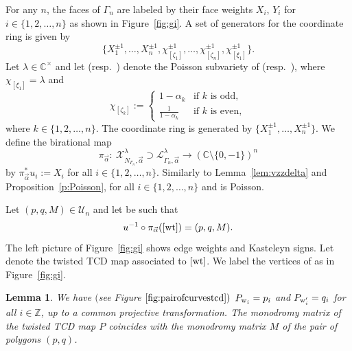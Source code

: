 \documentclass[pdftex]{sigma}
\numberwithin{equation}{section}
\newtheorem{Lemma}[Theorem]{Lemma}
\newcommand{\Z}{{\mathbb Z}}
\newcommand{\C}{{\mathbb C}}
\newcommand{\CP}{{\mathbb C\mathrm P}}
\newcommand{\A}{{\mathbb A}}
\newcommand{\ra}{\rightarrow}
\newcommand{\la}{\label}
\newcommand{\w}{{\rm w}}
\newcommand{\wt}{{\rm wt}}
\begin{document}
	For any $n$, the faces of $\Gamma_n$ are labeled by their face weights $X_i$, $Y_i$ for $i \in \{1,2,\dots,n\}$ as shown in Figure~\ref{fig:gi}. A set of generators for the coordinate ring  is given by	
	\[
	\bigl\{X_1^{\pm 1}, \dots,X_n^{\pm 1},\chi_{[\zeta_1]}^{\pm 1},\dots,\chi_{[\zeta_n]}^{\pm 1},\chi_{[\xi_1]}^{\pm 1}\bigr\}.
	\]
Let $\lambda \in \C^\times$ and let  \big(resp.\ \big) denote the Poisson subvariety of  \big(resp.\ \big), where $\chi_{[\xi_1]}=\lambda$ and
	\[
	\chi_{[\zeta_{k}]} := \begin{cases}
		1-\alpha_{k}&\text{if $k$ is odd},\\
		\frac{1}{1-\alpha_{k}}&\text{if $k$ is even},
	\end{cases} \]
	where $k \in \{1,2,\dots,n\}$. The coordinate ring  is generated by $\bigl\{X_1^{\pm 1}, \dots,X_n^{\pm 1}\bigr\}$. We define the birational map
\[
\pi_{\vec \alpha} \colon \ \mathcal X_{N_{\Gamma_n},\vec \alpha}^\lambda \supset \mathcal L_{\Gamma_n,\vec \alpha}^\lambda \ra (\C \setminus \{0,-1\})^n
\]
 by $\pi_{\vec \alpha}^*u_i := X_i$ for all $i \in \{1,2,\dots,n\}$. Similarly to Lemma~\ref{lem:vzzdelta} and Proposition~\ref{p:Poisson},  for all $i \in \{1,2,\dots,n\}$ and \smash{$\pi_{\vec \alpha}$} is Poisson.
	
	
	Let $(p,q,M)\in\mathcal U_n$ and let \smash{$[\wt] \in \mathcal X_{N_{\Gamma_n},\vec \alpha}^\lambda$} be such that
\[
u^{-1} \circ \pi_{\vec \alpha}([\wt])=(p,q,M).
\]
The left picture of Figure~\ref{fig:gi} shows edge weights and Kasteleyn signs. Let \smash{$P\colon W\bigl(\Gamma_{n,\widehat \A}\bigr) \ra \CP^1$} denote the twisted TCD map associated to $[\wt]$. We label the vertices of \smash{$\Gamma_{n,\widehat \A}$} as in Figure~\ref{fig:gi}.
	
	\begin{Lemma}\la{lem:tcddef}
		We have $($see Figure $\ref{fig:pairofcurvestcd})$
		$P_{\w_i}=p_i$ and $P_{\w_i'}=q_i$ for all $i \in \Z$, up to a {common} projective transformation. The monodromy matrix of the twisted TCD map $P$ coincides with the monodromy matrix $M$ of the pair of polygons $(p,q)$.
	\end{Lemma}
	
\end{document}
